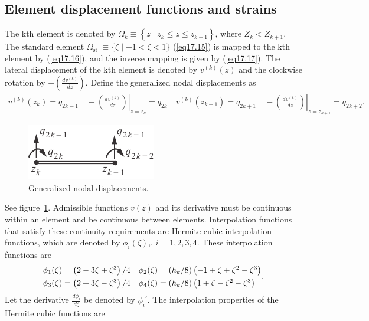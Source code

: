 \documentclass{AeroStructure-ERJohnson}
\begin{document}
\subsection{Element displacement functions and strains}\label{sec17.4.1}

The kth element is denoted by $\Omega_{k} \equiv\left\{z \mid z_{k} \leq z \leq z_{k+1}\right\}$, where $Z_{k}<Z_{k+1}$. The standard element $\Omega_{\text {st }} \equiv\{\zeta \mid-1<{\zeta<1}\}$ (\ref{eq17.15}) is mapped to the kth element by (\ref{eq17.16}), and the inverse mapping is given by (\ref{eq17.17}). The lateral displacement of the kth element is denoted by $v^{(k)}(z)$ and the clockwise rotation by $-\left(\frac{d v^{(k)}}{d z}\right)$. Define the generalized nodal displacements as
\begin{align}\label{eq17.139}
v^{(k)}\left(z_{k}\right)=q_{2 k-1}\quad -\!\left.\left(\frac{d v^{(k)}}{d z}\right)\right|_{z=z_{k}}=q_{2 k} \quad v^{(k)}\left(z_{k+1}\right)=q_{2 k+1} \quad-\!\left.\left(\frac{d v^{(k)}}{d z}\right)\right|_{z=z_{k+1}}=q_{2 k+2}.
\end{align}
\begin{figure}
\vspace*{-12pt}
\includegraphics{Figure_17-23.pdf}
\caption{Generalized nodal displacements.\label{fig17.23}}
\end{figure}
See figure~\ref{fig17.23}. Admissible functions $v(z)$ and its derivative must be continuous within an element and be continuous between elements. Interpolation functions that satisfy these continuity requirements are Hermite cubic interpolation functions, which are denoted by $\phi_{i}(\zeta)$,. $i=1,2,3,4$. These interpolation functions are
\begin{align}\label{eq17.140}
\begin{array}{@{}ll@{}}\phi_{1}(\zeta)=\left(2-3 \zeta+\zeta^{3}\right)/4 & \phi_{2}(\zeta)=\left(h_{k}/ 8\right)\left(-1+\zeta+\zeta^{2}-\zeta^{3}\right) \\[4pt]\phi_{3}(\zeta)=\left(2+3 \zeta-\zeta^{3}\right)/4 & \phi_{4}(\zeta)=\left(h_{k}/8\right)\left(1+\zeta-\zeta^{2}-\zeta^{3}\right)\end{array}.
\end{align}
Let the derivative $\frac{d \phi_{i}}{d \zeta}$ be denoted by $\phi_{i}{ }^{\prime}$. The interpolation properties of the Hermite cubic functions are
\end{document}
